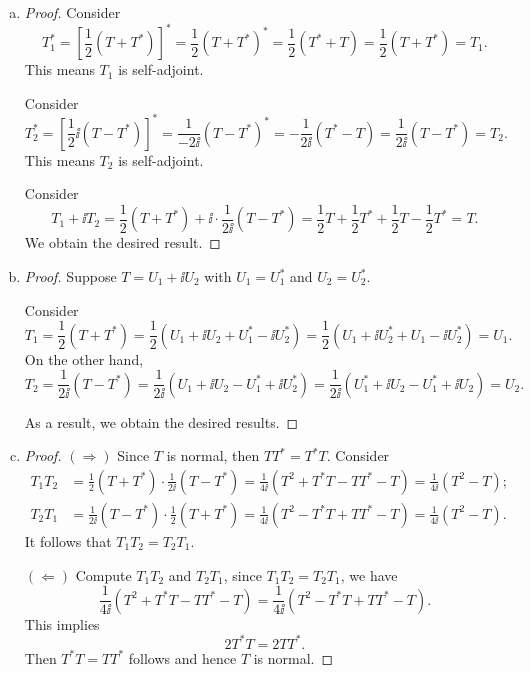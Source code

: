\begin{Exercise}
\begin{enumerate}[(a)]
\item
\begin{proof}
Consider
$$
T_1^*
= \left[ \frac{1}{2}(T+T^*) \right]^*
= \frac{1}{2} (T+T^*)^*
= \frac{1}{2} (T^*+T)
= \frac{1}{2} (T + T^*)
= T_1.
$$
This means $T_1$ is self-adjoint.

Consider
$$
T_2^*
= \left[ \frac{1}{2}\ii(T-T^*) \right]^*
= \frac{1}{-2\ii}(T-T^*)^*
= -\frac{1}{2\ii}(T^*-T)
= \frac{1}{2\ii}(T-T^*)
= T_2.
$$
This means $T_2$ is self-adjoint.

Consider
$$
T_1 + \ii T_2
= \frac{1}{2}(T+T^*) + \ii \cdot \frac{1}{2\ii} (T-T^*)
= \frac{1}{2}T+ \frac{1}{2}T^* + \frac{1}{2}T - \frac{1}{2}T^*
= T.
$$
We obtain the desired result.
\end{proof}

\item
\begin{proof}
Suppose $T = U_1+\ii U_2$ with $U_1 = U_1^*$ and $U_2 = U_2^*$.

Consider
$$
T_1
= \frac{1}{2}(T+T^*)
= \frac{1}{2}(U_1 + \ii U_2 + U_1^* - \ii U_2^*)
= \frac{1}{2}(U_1 + \ii U_2^* + U_1 - \ii U_2^*)
= U_1.
$$
On the other hand,
$$
T_2
= \frac{1}{2\ii}(T-T^*)
= \frac{1}{2\ii}(U_1 + \ii U_2 - U_1^* + \ii U_2^*)
= \frac{1}{2\ii}(U_1^*+\ii U_2 - U_1^* + \ii U_2)
= U_2.
$$

As a result, we obtain the desired results.
\end{proof}

\item
\begin{proof}
$(\Longrightarrow)$
Since $T$ is normal, then $T T^* = T^*T$. Consider
\begin{align*}
T_1 T_2 
&= \frac{1}{2}(T+T^*)\cdot \frac{1}{2\ii}(T-T^*)
= \frac{1}{4\ii}(T^2+T^* T-T T^*-T)
= \frac{1}{4\ii}(T^2-T); \\
T_2 T_1
&= \frac{1}{2\ii}(T-T^*)\cdot \frac{1}{2}(T+T^*)
= \frac{1}{4\ii}(T^2-T^*T+T T^*-T)
= \frac{1}{4\ii}(T^2-T).
\end{align*}
It follows that $T_1 T_2 = T_2 T_1$.

\vspace{2ex}

$(\Longleftarrow)$
Compute $T_1 T_2$ and $T_2 T_1$, since $T_1 T_2 = T_2 T_1$, we have
$$
\frac{1}{4\ii}(T^2+T^* T-T T^*-T)
= \frac{1}{4\ii}(T^2-T^*T+T T^*-T).
$$
This implies
$$
2T^* T = 2T T^*.
$$
Then $T^* T = T T^*$ follows and hence $T$ is normal.
\end{proof}
\end{enumerate}
\end{Exercise}